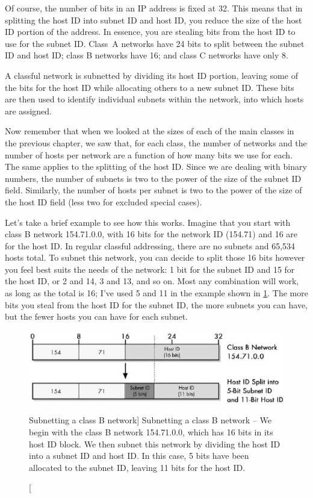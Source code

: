 Of course, the number of bits in an IP address is fixed at 32.
This means that in splitting the host ID into subnet ID and host ID, you reduce the size of the host ID portion of the address.
In essence, you are stealing bits from the host ID to use for the subnet ID.
Class~A networks have 24 bits to split between the subnet ID and host ID; class B networks have 16; and class C networks have only 8.


\begin{keyconcept}
A classful network is subnetted by dividing its
host ID portion, leaving some of the bits for the host ID while
allocating others to a new subnet ID. These bits are then used to
identify individual subnets within the network, into which hosts are
assigned.
\end{keyconcept}

Now remember that when we looked at the sizes of each of the main
classes in the previous chapter, we saw that, for each class, the number
of networks and the number of hosts per network are a function of how
many bits we use for each. The same applies to the splitting of the host
ID. Since we are dealing with binary numbers, the number of subnets is
two to the power of the size of the subnet ID field. Similarly, the
number of hosts per subnet is two to the power of the size of the host
ID field (less two for excluded special cases).

Let's take a brief example to see how this works. Imagine that you start
with class B network 154.71.0.0, with 16 bits for the network ID
(154.71) and 16 are for the host ID. In regular classful addressing,
there are no subnets and 65,534 hosts total. To subnet this network, you
can decide to split those 16 bits however you feel best suits the needs
of the network: 1 bit for the subnet ID and 15 for the host ID, or 2 and
14, 3 and 13, and so on. Most any combination will work, as long as the total is 16;
I've used 5 and 11 in the example shown in \cref{fig:subnetting-class-b-example}.
The more bits you steal from the host ID for the subnet ID, the more subnets you can have, but the fewer hosts you can have for each subnet.


\begin{figure}
   \centering
   \includegraphics[width=.7\textwidth]{images/subnetting-class-b-example.jpg}
   \caption
      [Subnetting a class B network]
      {Subnetting a class B network -- We begin with the class B network 154.71.0.0, which has 16 bits in its host ID block.
      We then subnet this network by dividing the host ID into a subnet ID and host ID.
      In this case, 5 bits have been allocated to the subnet ID, leaving 11 bits for the host ID.}
   \label{fig:subnetting-class-b-example}
\end{figure}


